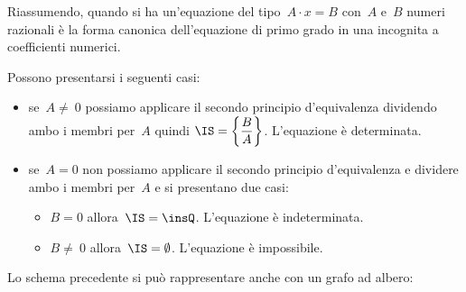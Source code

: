 Riassumendo, quando si ha un'equazione del tipo~$A\cdot x=B$ con~$A$ e~$B$ numeri
razionali è la forma canonica dell'equazione di primo grado in una
incognita a coefficienti numerici.%

Possono presentarsi i seguenti casi:
 \begin{itemize}
 \item se~$A\neq~0$ possiamo applicare il secondo principio
d'equivalenza dividendo ambo i membri per~$A$ quindi
$\IS =\left\{\dfrac{B}{A}\right\}$. L'equazione
è determinata.

 \item se~$A=0$ non possiamo applicare il secondo principio
d'equivalenza e dividere ambo i membri per~$A$ e si
presentano due casi:

\begin{itemize}
 \item $B=0$ allora~$\IS =\insQ$. L'equazione
è indeterminata.

\item $B\neq~0$ allora~$\IS =\emptyset $.
L'equazione è impossibile.
\end{itemize}
 \end{itemize}
\pagebreak

Lo schema precedente si può rappresentare anche con un grafo ad
albero:
\begin{center}
 
\end{center}

\ovalbox{\risolvii \ref{ese:15.23}, \ref{ese:15.24}, \ref{ese:15.25}, \ref{ese:15.26}, \ref{ese:15.27}, \ref{ese:15.28}, \ref{ese:15.29}, \ref{ese:15.30}, \ref{ese:15.31}, \ref{ese:15.32}, \ref{ese:15.33}}

\ovalbox{\ref{ese:15.34}, \ref{ese:15.35}, \ref{ese:15.36}, \ref{ese:15.37}, \ref{ese:15.38}, \ref{ese:15.39}, \ref{ese:15.40}, \ref{ese:15.41}, \ref{ese:15.42}, \ref{ese:15.43}}
\newpage

\cleardoublepage
